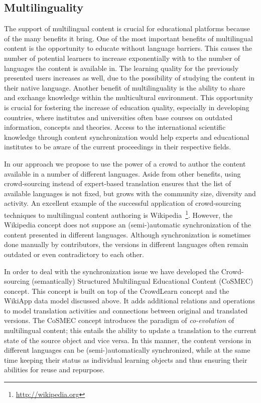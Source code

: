 \documentclass[ngerman,UKenglish,table]{scrbook}
\begin{document}
\subsection{Multilinguality}

The support of multilingual content is crucial for educational platforms because of the many benefits it bring. %
One of the most important benefits of multilingual content is the opportunity to educate without language barriers.
This causes the number of potential learners to increase exponentially with to the number of languages the content is available in.
The learning quality for the previously presented users increases as well, due to the possibility of studying the content in their native language.
Another benefit of multilinguality is the ability to share and exchange knowledge within the multicultural environment.
This opportunity is crucial for fostering the increase of  education quality, especially in developing countries, where institutes and universities often base courses on outdated information, concepts and theories.
Access to the international scientific knowledge through content synchronization would help experts and educational institutes to be aware of  the current proceedings in their respective fields.

In our approach we propose to use the power of a crowd to author the content available in a number of different languages. 
Aside from other benefits, using crowd-sourcing instead of expert-based translation ensures that the list of available languages is not fixed, but grows with the community size, diversity and activity.
An excellent example of the successful application of crowd-sourcing techniques to multilingual content authoring is Wikipedia~\footnote{\url{http://wikipedia.org}}.
However, the Wikipedia concept does not suppose an (semi-)automatic synchronization of the content presented in different languages.
Although  synchronization is sometimes done manually by contributors, the versions in different languages often remain outdated or even contradictory to each other.

In order to deal with the synchronization issue we have developed the Crowd-sourcing (semantically) Structured Multilingual Educational Content (CoSMEC) concept.
This concept is built on top of the CrowdLearn concept and the WikiApp data model discussed above.
It adds additional relations and operations to model translation activities and connections between original and translated versions.%
The CoSMEC concept introduces the paradigm of \emph{co-evolution} of multilingual content; this entails the ability to update a translation to the current state of the source object and vice versa. 
In this manner, the content versions in different languages can be (semi-)automatically synchronized, while at the same time keeping their status as individual learning objects and thus ensuring their abilities for reuse and repurpose. 
\end{document}
